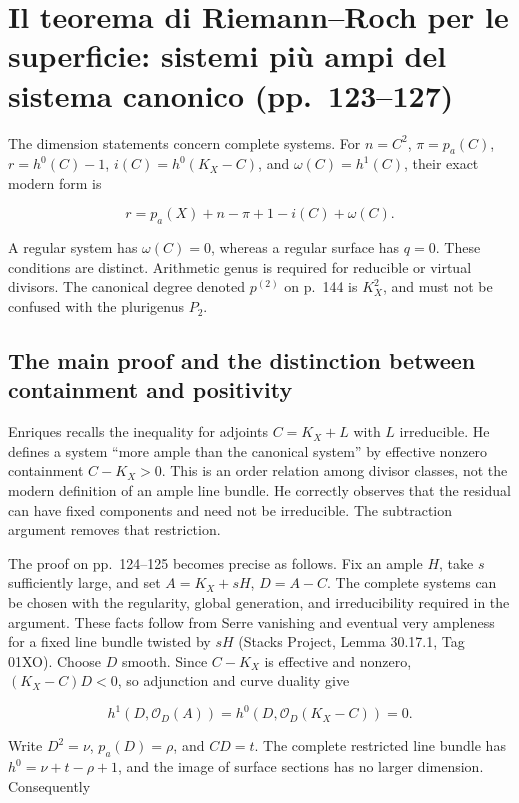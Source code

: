 \section[Sistemi oltre il canonico]{Il teorema di Riemann--Roch per le superficie: sistemi più ampi del sistema canonico (pp.~123--127)}\label{enriques-iv-8}

The dimension statements concern complete systems. For \(n=C^2\), \(\pi=p_a(C)\), \(r=h^0(C)-1\), \(i(C)=h^0(K_X-C)\), and \(\omega(C)=h^1(C)\), their exact modern form is

\[r=p_a(X)+n-\pi+1-i(C)+\omega(C). \tag{IV.8.1}\]

A regular system has \(\omega(C)=0\), whereas a regular surface has \(q=0\). These conditions are distinct. Arithmetic genus is required for reducible or virtual divisors. The canonical degree denoted \(p^{(2)}\) on p.~144 is \(K_X^2\), and must not be confused with the plurigenus \(P_2\).

\subsection{The main proof and the distinction between containment and positivity}

Enriques recalls the inequality for adjoints \(C=K_X+L\) with \(L\) irreducible. He defines a system ``more ample than the canonical system'' by effective nonzero containment \(C-K_X>0\). This is an order relation among divisor classes, not the modern definition of an ample line bundle. He correctly observes that the residual can have fixed components and need not be irreducible. The subtraction argument removes that restriction.

The proof on pp.~124--125 becomes precise as follows. Fix an ample \(H\), take \(s\) sufficiently large, and set \(A=K_X+sH\), \(D=A-C\). The complete systems can be chosen with the regularity, global generation, and irreducibility required in the argument. These facts follow from Serre vanishing and eventual very ampleness for a fixed line bundle twisted by \(sH\) (Stacks Project, Lemma 30.17.1, Tag 01XO). Choose \(D\) smooth. Since \(C-K_X\) is effective and nonzero, \((K_X-C)D<0\), so adjunction and curve duality give

\[
h^1(D,\mathcal O_D(A))=h^0(D,\mathcal O_D(K_X-C))=0.
\]

Write \(D^2=\nu\), \(p_a(D)=\rho\), and \(CD=t\). The complete restricted line bundle has \(h^0=\nu+t-\rho+1\), and the image of surface sections has no larger dimension. Consequently

